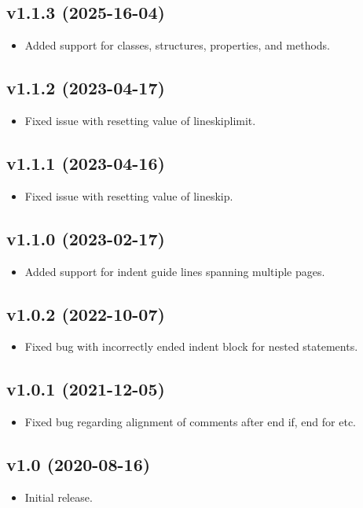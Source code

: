\documentclass[11pt,a4paper,USenglish]{article}
\begin{document}
\subsection*{v1.1.3 (2025-16-04)}
\begin{itemize}
  \item Added support for classes, structures, properties, and methods.
\end{itemize}

\subsection*{v1.1.2 (2023-04-17)}
\begin{itemize}
	\item Fixed issue with resetting value of lineskiplimit.
\end{itemize}

\subsection*{v1.1.1 (2023-04-16)}
\begin{itemize}
	\item Fixed issue with resetting value of lineskip.
\end{itemize}

\subsection*{v1.1.0 (2023-02-17)}
\begin{itemize}
	\item Added support for indent guide lines spanning multiple pages.
\end{itemize}

\subsection*{v1.0.2 (2022-10-07)}
\begin{itemize}
	\item Fixed bug with incorrectly ended indent block for nested statements.
\end{itemize}

\subsection*{v1.0.1 (2021-12-05)}
\begin{itemize}
	\item Fixed bug regarding alignment of comments after end if, end for etc.
\end{itemize}

\subsection*{v1.0 (2020-08-16)}
\begin{itemize}
	\item Initial release.
\end{itemize}
\end{document}

